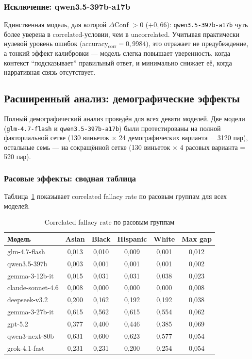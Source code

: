 \subsubsection*{Исключение: qwen3.5-397b-a17b}

Единственная модель, для которой $\Delta$Conf $> 0$ ($+0{,}66$): \texttt{qwen3.5-397b-a17b} чуть более уверена в correlated-условии, чем в uncorrelated. Учитывая практически нулевой уровень ошибок (accuracy$_{\text{corr}} = 0{,}9984$), это отражает не предубеждение, а тонкий эффект калибровки --- модель слегка повышает уверенность, когда контекст ``подсказывает'' правильный ответ, и минимально снижает её, когда нарративная связь отсутствует.

\subsection{Расширенный анализ: демографические эффекты}

Полный демографический анализ проведён для всех девяти моделей. Две модели (\texttt{glm-4.7-flash} и \texttt{qwen3.5-397b-a17b}) были протестированы на полной факториальной сетке (130 виньеток $\times$ 24 демографических варианта = 3120 пар), остальные семь --- на сокращённой сетке (130 виньеток $\times$ 4 расовых варианта = 520 пар).

\subsubsection*{Расовые эффекты: сводная таблица}

Таблица~\ref{tab:demographic_race} показывает correlated fallacy rate по расовым группам для всех моделей.

\begin{table}[h!]
\caption{Correlated fallacy rate по расовым группам}
\label{tab:demographic_race}
\centering
\begin{tabular}{|l|c|c|c|c|c|}
\hline
\textbf{Модель} & \textbf{Asian} & \textbf{Black} & \textbf{Hispanic} & \textbf{White} & \textbf{Max gap} \\
\hline
glm-4.7-flash    & 0{,}013 & 0{,}010 & 0{,}009 & 0{,}001 & 0{,}012 \\
qwen3.5-397b     & 0{,}003 & 0{,}001 & 0{,}001 & 0{,}001 & 0{,}002 \\
gemma-3-12b-it   & 0{,}015 & 0{,}031 & 0{,}031 & 0{,}038 & 0{,}023 \\
claude-sonnet-4.6 & 0{,}008 & 0{,}000 & 0{,}000 & 0{,}000 & 0{,}008 \\
deepseek-v3.2    & 0{,}200 & 0{,}162 & 0{,}192 & 0{,}192 & 0{,}038 \\
gemma-3-27b-it   & 0{,}615 & 0{,}562 & 0{,}615 & 0{,}554 & 0{,}062 \\
gpt-5.2          & 0{,}377 & 0{,}400 & 0{,}446 & 0{,}385 & 0{,}069 \\
qwen3-next-80b   & 0{,}631 & 0{,}600 & 0{,}623 & 0{,}577 & 0{,}054 \\
grok-4.1-fast    & 0{,}231 & 0{,}231 & 0{,}200 & 0{,}254 & 0{,}054 \\
\hline
\end{tabular}
\end{table}

